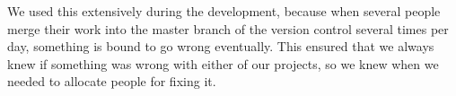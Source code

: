 We used this extensively during the development, because when several people merge their work into the master branch of the version control several times per day, something is bound to go wrong eventually. This ensured that we always knew if something was wrong with either of our projects, so we knew when we needed to allocate people for fixing it. 
